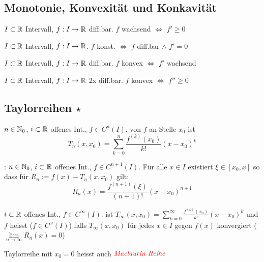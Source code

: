 \subsection{Monotonie, Konvexität und Konkavität}

\Satz $I \subset \mathbb{R}$ Intervall, $f: I \to \mathbb{R}$ diff.bar.
$f$ wachsend $\iff$ $f' \ge 0$

\Kor $I \subset \mathbb{R}$ Intervall, $f: I \to \mathbb{R}$.
$f$ konst. $\iff$ $f$ diff.bar $\land$ $f' = 0$

\Satz $I \subset \mathbb{R}$ Intervall, $f: I \to \mathbb{R}$ diff.bar.
$f$ konvex $\iff$ $f'$ wachsend

\Kor $I \subset \mathbb{R}$ Intervall, $f: I \to \mathbb{R}$ 2x diff.bar.
$f$ konvex $\iff$ $f'' \ge 0$

\subsection{Taylorreihen \texorpdfstring{$\star$}{*}}

\Def $n \in \mathbb{N}_0$, $i \subset \mathbb{R}$ offenes Int., $f \in C^n(I)$.  von $f$
an Stelle $x_0$ ist
$$T_n(x, x_0) = \sum_{k=0}^{n}\frac{f^{(k)}(x_0)}{k!}(x-x_0)^k$$ 

\Satz {}: $n \in \mathbb{N}_0$, $i \subset \mathbb{R}$ offenes Int., $f \in C^{n+1}(I)$. Für alle $x \in I$
existiert  $\xi \in [x_0, x]$ so dass für $R_n := f(x) - T_n(x, x_0)$ gilt:
$$R_n(x) = \frac{f^{(n+1)}(\xi)}{(n+1)!}(x-x_0)^{n+1}$$

\Def $i \subset \mathbb{R}$ offenes Int., $f \in C^\infty(I)$.  ist 
$T_\infty(x, x_0) = \sum_{k=0}^{\infty}\frac{f^{(k)}(x_0)}{k!}(x-x_0)^k$
und $f$ heisst  ($f \in C^\omega(I)$) falls $T_\infty(x, x_0)$ für jedes
$x \in I$ gegen $f(x)$ konvergiert ($\lim\limits_{n\to\infty} R_n(x) = 0$)

\Def Taylorreihe mit $x_0 = 0$ heisst auch $\textit{\color{red}{Maclaurin-Reihe}}$

